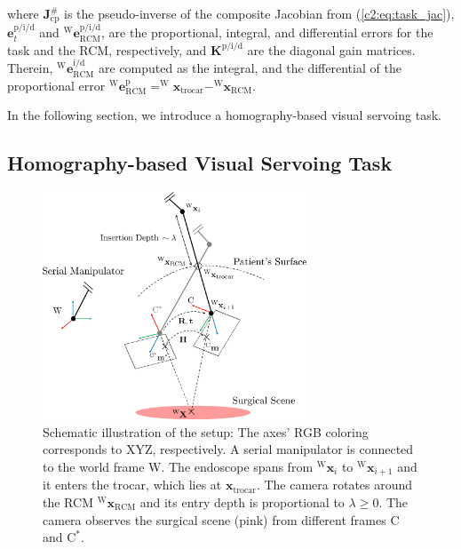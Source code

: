 where $\mathbf{J}_\text{cp}^\#$ is the pseudo-inverse of the composite Jacobian from (\eqref{c2:eq:task_jac}), $\mathbf{e}^{\text{p}/\text{i}/\text{d}}_t$ and $^\text{W}\mathbf{e}^{\text{p}/\text{i}/\text{d}}_\text{RCM}$, are the proportional, integral, and differential errors for the task and the RCM, respectively, and $\mathbf{K}^{\text{p}/\text{i}/\text{d}}$ are the diagonal gain matrices. Therein, $^\text{W}\mathbf{e}_\text{RCM}^{\text{i}/\text{d}}$ are computed as the integral, and the differential of the proportional error $^\text{W}\mathbf{e}_\text{RCM}^\text{p} = ^\text{W}\mathbf{x}_\text{trocar} - ^\text{W}\mathbf{x}_\text{RCM}$. 

In the following section, we introduce a homography-based visual servoing task.

\subsection{Homography-based Visual Servoing Task}
\label{c2:sec:homography_task}

\begin{figure}[tb]
\centering
\includegraphics[width=0.7\textwidth]{img/h_rcm_vs_fig.pdf}
\caption{Schematic illustration of the setup: The axes' RGB coloring corresponds to XYZ, respectively. A serial manipulator is connected to the world frame W. The endoscope spans from $^\text{W}\mathbf{x}_i$ to $^\text{W}\mathbf{x}_{i+1}$ and it enters the trocar, which lies at $\mathbf{x}_\text{trocar}$. The camera rotates around the RCM $^\text{W}\mathbf{x}_\text{RCM}$ and its entry depth is proportional to $\lambda \geq 0$.  The camera observes the surgical scene (pink) from different frames $\text{C}$ and $\text{C}^*$.}
\label{c2:fig:schematic}
\end{figure}

